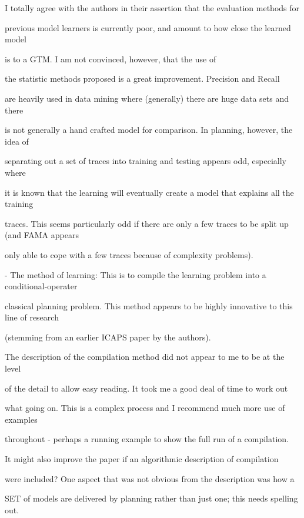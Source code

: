 \documentclass{article}
\begin{document}
\begin{mdframed}[hidealllines=true,backgroundcolor=gray!20]
  I totally agree with the authors in their assertion that the evaluation methods for

previous model learners is currently poor, and amount to how close the learned model

is to a GTM. I am not convinced, however, that the use of

the statistic methods proposed is a great improvement. Precision and Recall

are heavily used in data mining where (generally) there are huge data sets and there

is not generally a hand crafted model for comparison. In planning, however, the idea of

separating out a set of traces into training and testing appears odd, especially where

it is known that the learning will eventually create a model that explains all the training

traces. This seems particularly odd if there are only a few traces to be split up (and FAMA appears

only able to cope  with a few traces because of complexity problems).
\end{mdframed}

\begin{mdframed}[hidealllines=true,backgroundcolor=gray!20]
  - The method of learning: This is to compile the learning problem into a conditional-operater

classical planning problem. This method appears to be highly innovative to this line of research

(stemming from an earlier ICAPS paper by the authors).

The description of the compilation method did not appear to me to be at the level

of the detail to allow easy reading. It took me a good deal of time to work out

what going on. This is a complex process and I recommend much more use of examples

throughout - perhaps a running example to show the full run of a compilation.

It might also improve the paper if an algorithmic description of compilation

were included? One aspect that was not obvious from the description was how a

SET of models are delivered by planning rather than just one; this needs spelling out.
\end{mdframed}
\end{document}

